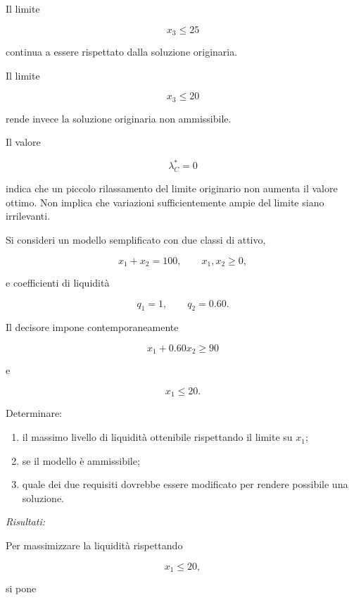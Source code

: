 Il limite

\[
x_3\leq25
\]

\noindent continua a essere rispettato dalla soluzione originaria.

Il limite

\[
x_3\leq20
\]

\noindent rende invece la soluzione originaria non ammissibile.

Il valore

\[
\lambda_C^*=0
\]

\noindent indica che un piccolo rilassamento del limite originario non aumenta il
valore ottimo. Non implica che variazioni sufficientemente ampie del limite
siano irrilevanti.


\begin{exercise}

\label{ex:cap11-proposto-inammissibile}

Si consideri un modello semplificato con due classi di attivo,

\[
x_1+x_2=100,
\qquad
x_1,x_2\geq0,
\]

\noindent e coefficienti di liquidit\`a

\[
q_1=1,
\qquad
q_2=0.60.
\]

Il decisore impone contemporaneamente

\[
x_1+0.60x_2\geq90
\]

\noindent e

\[
x_1\leq20.
\]

Determinare:

\begin{enumerate}

\item il massimo livello di liquidit\`a ottenibile rispettando il limite
su \(x_1\);

\item se il modello \`e ammissibile;

\item quale dei due requisiti dovrebbe essere modificato per rendere
possibile una soluzione.

\end{enumerate}

\end{exercise}

\noindent
\textit{Risultati:}

Per massimizzare la liquidit\`a rispettando

\[
x_1\leq20,
\]

\noindent si pone


